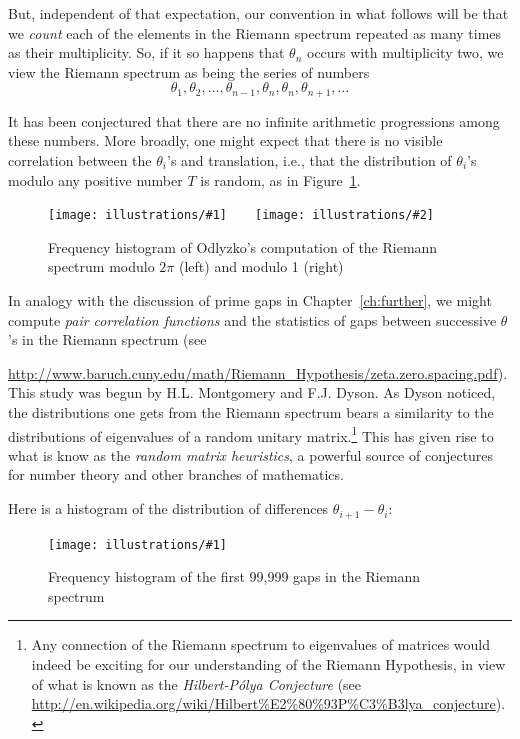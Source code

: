 \documentclass[openany]{book}
\newcommand{\ill}[3]{%
   \begin{figure}[H]%
   \vspace{-2ex}
   \centering%
   \texttt{[image: illustrations/\#1]}%
   \caption{#3}%
   \vspace{-2ex}
    \end{figure}}
\newcommand{\illtwo}[4]{%
   \begin{figure}[H]\centering%
   \texttt{[image: illustrations/\#1]}$\qquad$\texttt{[image: illustrations/\#2]}%
   \caption{#4}%
    \end{figure}}
\theoremstyle{plain}
\theoremstyle{definition}
\newcommand{\RH}{Riemann Hypothesis\index{Riemann Hypothesis}}
\begin{document}
{  But, independent of
that expectation, our convention in what follows will be that we {\it
  count} each of the elements in the Riemann spectrum repeated as many
times as their multiplicity. So, if it so happens that $\theta_n$
occurs with multiplicity two, we view the Riemann spectrum as being
the series of numbers
  $$\theta_1, \theta_2, \dots, \theta_{n-1}, \theta_n, \theta_n, \theta_{n+1}, \dots$$

It has been conjectured that there are no infinite arithmetic progressions among these numbers.  More broadly, one might expect that there is no visible  correlation between the $\theta_i$'s and translation, i.e., that the distribution of $\theta_i$'s modulo any positive number $T$ is random, as in Figure~\ref{fig:zero-spacing}.



\illtwo{zero-spacing-mod2pi}{zero-spacing-mod1}{0.4}{Frequency histogram of Odlyzko's computation of the Riemann spectrum\index{Riemann spectrum} modulo $2\pi$ (left) and modulo 1 (right)\label{fig:zero-spacing}}

        In analogy with the discussion of prime gaps in Chapter~\ref{ch:further}, we might compute {\it pair correlation functions} and the statistics of gaps between successive $\theta$'s in the Riemann spectrum (see {\url{http://www.baruch.cuny.edu/math/Riemann_Hypothesis/zeta.zero.spacing.pdf}). This study was  begun by H.\thinspace{}L. Montgomery and
F.\thinspace{}J. Dyson.
As  Dyson noticed, the distributions one gets from the Riemann spectrum bears a similarity to the distributions of eigenvalues of a random unitary matrix.{\footnote{Any connection of the Riemann spectrum to eigenvalues of matrices would indeed be exciting for our understanding of the \RH{}, in view of what is known as the {\it Hilbert-P{\'o}lya Conjecture}  (see {\url{http://en.wikipedia.org/wiki/Hilbert\%E2\%80\%93P\%C3\%B3lya_conjecture}}).}} This has given rise to what is know as the {\it random matrix heuristics},  a powerful source of conjectures for number theory and other branches of mathematics.

        Here is a histogram of the distribution of differences $\theta_{i+1}-\theta_i$:
\


\ill{riemann_spectrum_gaps}{0.95}{Frequency histogram of the
first 99{,}999 gaps in the Riemann spectrum\label{fig:riemann_spectrum_gaps}}

}}
\end{document}
